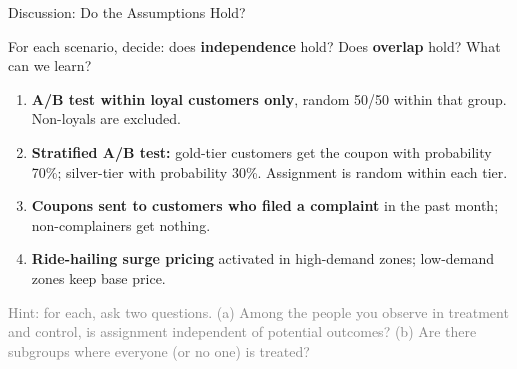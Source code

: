 \documentclass[aspectratio=169, 11pt]{beamer}
\begin{document}
\begin{frame}{Discussion: Do the Assumptions Hold?}
 
For each scenario, decide: does \textbf{independence} hold? Does \textbf{overlap} hold? What can we learn?
 
\bigskip
 
\begin{enumerate}
    \item \textbf{A/B test within loyal customers only}, random 50/50 within that group. Non-loyals are excluded.
 
    \medskip
 
    \item \textbf{Stratified A/B test:} gold-tier customers get the coupon with probability 70\%; silver-tier with probability 30\%. Assignment is random within each tier.
 
    \medskip
 
    \item \textbf{Coupons sent to customers who filed a complaint} in the past month; non-complainers get nothing.
 
    \medskip
 
    \item \textbf{Ride-hailing surge pricing} activated in high-demand zones; low-demand zones keep base price.
\end{enumerate}
 
\bigskip
\pause
 
\textcolor{gray}{\footnotesize Hint: for each, ask two questions. (a) Among the people you observe in treatment and control, is assignment independent of potential outcomes? (b) Are there subgroups where everyone (or no one) is treated?}
\end{frame}
 
\end{document}
